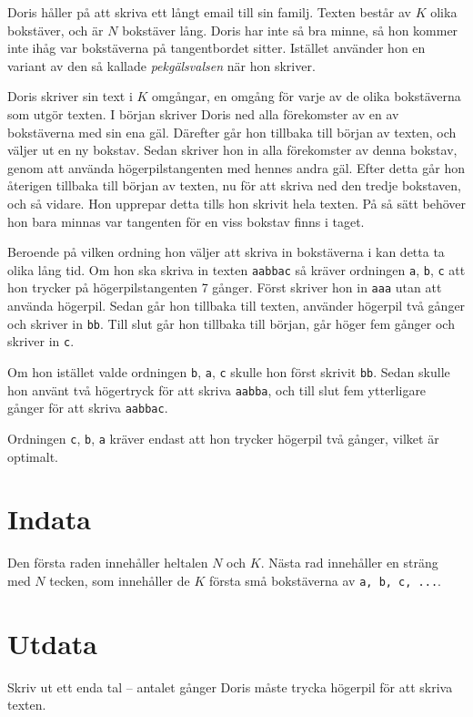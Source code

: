 Doris håller på att skriva ett långt email till sin familj.
Texten består av $K$ olika bokstäver, och är $N$ bokstäver lång.
Doris har inte så bra minne, så hon kommer inte ihåg var bokstäverna på tangentbordet sitter.
Istället använder hon en variant av den så kallade \emph{pekgälsvalsen} när hon skriver.

Doris skriver sin text i $K$ omgångar, en omgång för varje av de olika bokstäverna som utgör texten.
I början skriver Doris ned alla förekomster av en av bokstäverna med sin ena gäl.
Därefter går hon tillbaka till början av texten, och väljer ut en ny bokstav.
Sedan skriver hon in alla förekomster av denna bokstav, genom att använda högerpilstangenten med hennes andra gäl.
Efter detta går hon återigen tillbaka till början av texten, nu för att skriva ned den tredje bokstaven, och så vidare.
Hon upprepar detta tills hon skrivit hela texten.
På så sätt behöver hon bara minnas var tangenten för en viss bokstav finns i taget.

Beroende på vilken ordning hon väljer att skriva in bokstäverna i kan detta ta olika lång tid.
Om hon ska skriva in texten \texttt{aabbac} så kräver ordningen \texttt{a}, \texttt{b}, \texttt{c} att hon trycker på högerpilstangenten 7 gånger.
Först skriver hon in \texttt{aaa} utan att använda högerpil.
Sedan går hon tillbaka till texten, använder högerpil två gånger och skriver in \texttt{bb}.
Till slut går hon tillbaka till början, går höger fem gånger och skriver in \texttt{c}.

Om hon istället valde ordningen \texttt{b}, \texttt{a}, \texttt{c} skulle hon först skrivit \texttt{bb}.
Sedan skulle hon använt två högertryck för att skriva \texttt{aabba}, och till slut fem ytterligare gånger för att skriva \texttt{aabbac}.

Ordningen \texttt{c}, \texttt{b}, \texttt{a} kräver endast att hon trycker högerpil två gånger, vilket är optimalt.

\section*{Indata}
Den första raden innehåller heltalen $N$ och $K$.
Nästa rad innehåller en sträng med $N$ tecken, som innehåller de $K$ första små bokstäverna av \texttt{a, b, c, ...}.

\section*{Utdata}
Skriv ut ett enda tal -- antalet gånger Doris måste trycka högerpil för att skriva texten.

